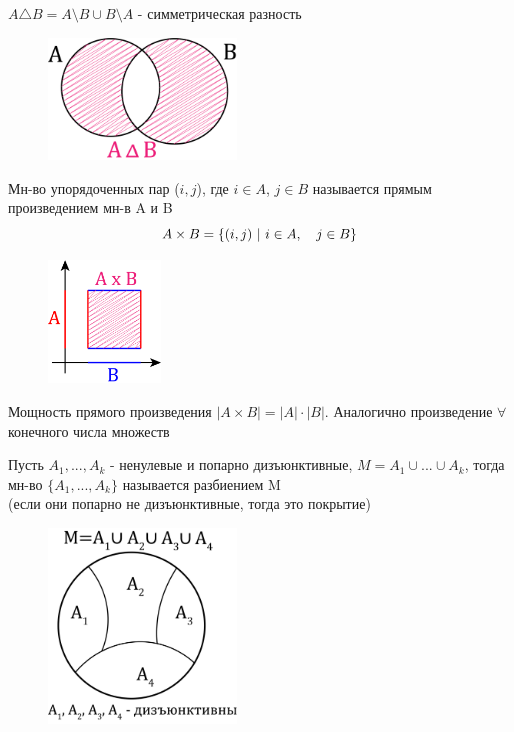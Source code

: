 \documentclass[discrete.tex]{subfiles}
\begin{document}
  \begin{definition}
    $A \triangle B = A \setminus B \cup B \setminus A$ - симметрическая разность
    \begin{figure}[H]
        \includegraphics[width=5cm]{pics/1_6.png}
        \centering
    \end{figure}
  \end{definition}

  \begin{definition}
    Мн-во упорядоченных пар ($i,j$), где $i \in A$, $j \in B$ называется прямым произведением мн-в A и B
    \[A \times B = \{(i,j)\ |\ i \in A,\quad j \in B\}\]
    \begin{figure}[H]
        \includegraphics[width=3cm]{pics/1_7.png}
        \centering
    \end{figure}
  \end{definition}

  \begin{remark}
    Мощность прямого произведения $|A \times B| = |A| \cdot |B|$. Аналогично произведение $\forall$ конечного числа множеств
  \end{remark}

  \begin{definition}
    Пусть $A_1,...,A_k$ - ненулевые и попарно дизъюнктивные, $M = A_1 \cup ... \cup A_k$, тогда мн-во $\{A_1,...,A_k\}$ называется разбиением M\\
    (если они попарно не дизъюнктивные, тогда это покрытие)
    \begin{figure}[H]
        \includegraphics[width=5cm]{pics/1_8.png}
        \centering
    \end{figure}
  \end{definition}
\end{document}
